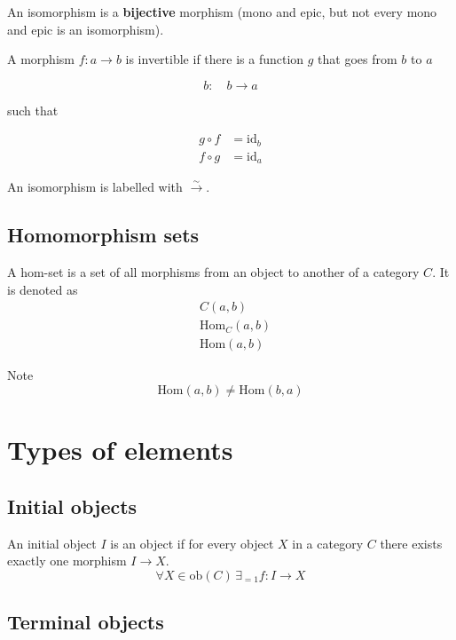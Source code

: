 \documentclass{article}
\begin{document}
An isomorphism is a \textbf{bijective} morphism (mono and epic, but not every mono and epic
is an isomorphism).

A morphism \(f: a \rightarrow b\) is invertible if there
is a function \(g\) that goes from \(b\) to \(a\)

\[
    b:\quad b \rightarrow a
\]

such that

\begin{align*}
    g \circ f &= \text{id}_b
    \\
    f \circ g &= \text{id}_a
\end{align*}

\begin{center}
\end{center}

An isomorphism is labelled with \(\xrightarrow{\sim}\).

\pagebreak

\subsection{Homomorphism sets} %

A hom-set is a set of all morphisms from an object to another
of a category \(C\).
It is denoted as
\begin{align*}
    &C(a, b) \\
    &\text{Hom}_C(a, b) \\
    &\text{Hom}(a, b)
\end{align*}

Note
\[
    \text{Hom}(a, b) \neq \text{Hom}(b, a)
\]

\section{Types of elements}

\subsection{Initial objects}

An initial object \(I\) is an object if
for every object \(X\) in a category \(C\)
there exists exactly one morphism \(I\to X\).
\[
    \forall X\in \text{ob}(C) \,\exists_{=1}f:I\to X
\]

\subsection{Terminal objects}
\end{document}
